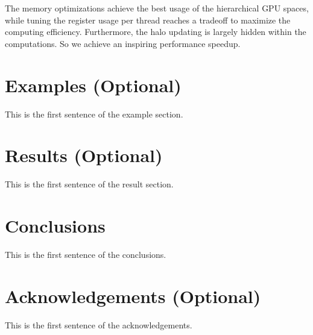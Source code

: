 \documentclass{paris17}
\begin{document}
The memory optimizations achieve the best usage of the hierarchical GPU spaces, while tuning the register usage per thread reaches a tradeoff to maximize the computing efficiency. Furthermore, the halo updating is largely hidden within the computations. So we achieve an inspiring performance speedup.

\section{Examples (Optional)}

This is the first sentence of the example section.

\section{Results (Optional)}

This is the first sentence of the result section.


\section{Conclusions}

This is the first sentence of the conclusions.

\section{Acknowledgements (Optional)}

This is the first sentence of the acknowledgements.



\end{document}
